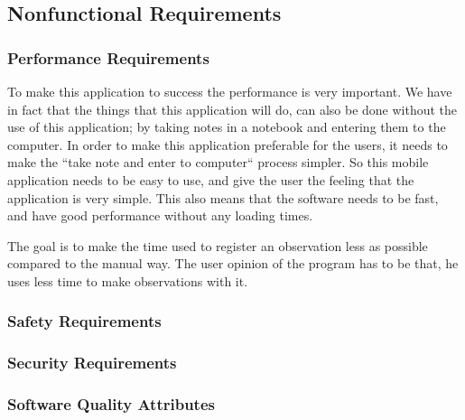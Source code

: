 \subsection{Nonfunctional Requirements}
\subsubsection{Performance Requirements}
	To make this application to success the performance is very important. We have in fact that the things that this application will do, can also be done without the use of this application; by taking notes in a notebook and entering them to the computer. In order to make this application  preferable for the users, it needs to make the ``take note and enter to computer`` process simpler.  So this mobile application  needs to be easy to use, and give the user the feeling that the application is very simple. This also means that the software needs to be fast, and have good performance without any loading times.

The goal is to make the time used to register an observation less as possible compared to the manual way. The user opinion of the program has to be that, he uses less time to make observations with it. 

\subsubsection{ Safety Requirements}
\subsubsection{ Security Requirements}
\subsubsection{ Software Quality Attributes}